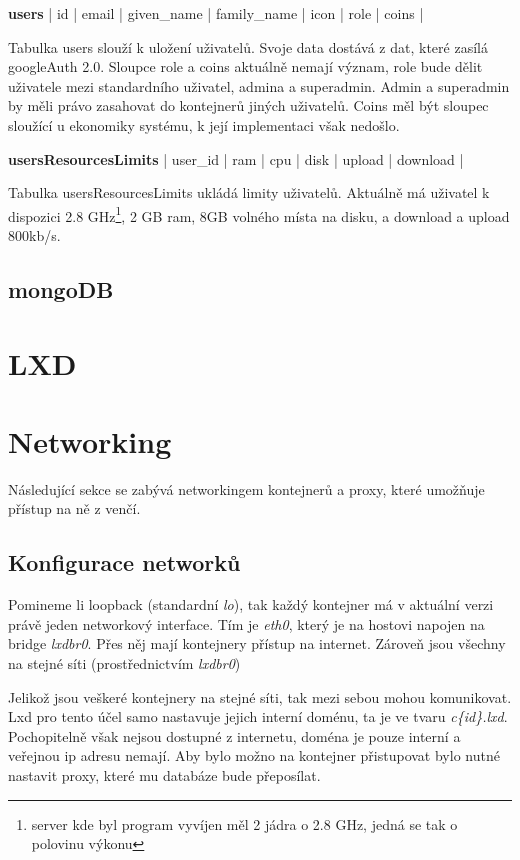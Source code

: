 \documentclass[a4paper,oneside,12pt]{report}
\begin{document}
\vspace{0.3cm}
\noindent
\textbf{users} | id | email | given\_name | family\_name | icon | role | coins |

Tabulka users slouží k uložení uživatelů.
Svoje data dostává z dat, které zasílá googleAuth 2.0.
Sloupce role a coins aktuálně nemají význam, role bude dělit uživatele mezi standardního uživatel, admina a superadmin.
Admin a superadmin by měli právo zasahovat do kontejnerů jiných uživatelů.
Coins měl být sloupec sloužící u ekonomiky systému, k její implementaci však nedošlo.


\vspace{0.3cm}
\noindent
\textbf{usersResourcesLimits} | user\_id | ram | cpu | disk | upload | download |

Tabulka usersResourcesLimits ukládá limity uživatelů.
Aktuálně má uživatel k dispozici 2.8 GHz\footnote{server kde byl program vyvíjen měl 2 jádra o 2.8 GHz, jedná se tak o polovinu výkonu}, 2 GB ram, 8GB volného místa na disku, a download a upload 800kb/s.

\subsection{mongoDB}


\section{LXD}

\section{Networking}

Následující sekce se zabývá networkingem kontejnerů a proxy, které umožňuje přístup na ně z venčí.

\subsection{Konfigurace networků}

Pomineme li loopback (standardní \textit{lo}), tak každý kontejner má v aktuální verzi právě jeden networkový interface.
Tím je \textit{eth0}, který je na hostovi napojen na bridge \textit{lxdbr0}.
Přes něj mají kontejnery přístup na internet.
Zároveň jsou všechny na stejné síti (prostřednictvím \textit{lxdbr0})

Jelikož jsou veškeré kontejnery na stejné síti, tak mezi sebou mohou komunikovat.
Lxd pro tento účel samo nastavuje jejich interní doménu, ta je ve tvaru \textit{c\{id\}.lxd}.
Pochopitelně však nejsou dostupné z internetu, doména je pouze interní a veřejnou ip adresu nemají.
Aby bylo možno na kontejner přistupovat bylo nutné nastavit proxy, které mu databáze bude přeposílat.
\end{document}

